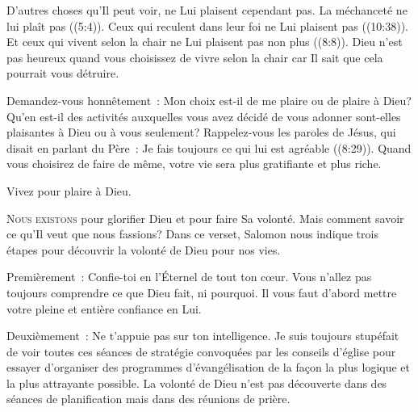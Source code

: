
D'autres choses qu'Il peut voir, ne Lui plaisent cependant pas.
 La méchanceté ne lui plaît pas ((5:4)).
 Ceux qui reculent dans leur foi ne Lui plaisent pas ((10:38)).
 Et ceux qui vivent selon la chair ne Lui plaisent pas non plus
 ((8:8)).
 Dieu n'est pas heureux quand vous choisissez de vivre selon la chair
 car Il sait que cela pourrait vous détruire. 

Demandez-vous honnêtement~:
 Mon choix est-il de me plaire ou de plaire à Dieu?
 Qu'en est-il des activités auxquelles vous avez décidé de vous adonner
 \ocadr sont-elles plaisantes à Dieu ou à vous seulement?
 Rappelez-vous les paroles de Jésus, qui disait en parlant du Père~:
 \og Je fais toujours ce qui lui est agréable \fg{} ((8:29)).
 Quand vous choisirez de faire de même,
 votre vie sera plus gratifiante et plus riche. 

Vivez pour plaire à Dieu. 

\dvrule






\lettrine{N}{ous existons} pour glorifier Dieu et pour faire Sa volonté.
 Mais comment savoir ce qu'Il veut que nous fassions?
 Dans ce verset, Salomon nous indique trois étapes pour découvrir
 la volonté de Dieu pour nos vies. 

Premièrement~: \og Confie-toi en l'Éternel de tout ton c\oe{}ur. \fg{}
 Vous n'allez pas toujours comprendre ce que Dieu fait, ni pourquoi.
 Il vous faut d'abord mettre votre pleine et entière confiance en Lui. 

Deuxièmement~: \og Ne t'appuie pas sur ton intelligence. \fg{}
 Je suis toujours stupéfait de voir toutes ces séances de stratégie
 convoquées par les conseils d'église pour essayer d'organiser
 des programmes d'évangélisation de la façon la plus logique
 et la plus attrayante possible.
 La volonté de Dieu n'est pas découverte dans des séances
 de planification mais dans des réunions de prière. 

